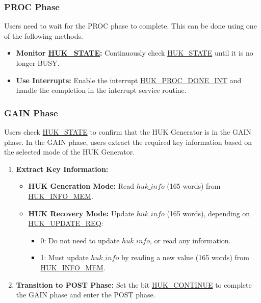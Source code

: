\documentclass[main\_\_EN.tex]{subfiles}
\begin{document}
\subsubsection{PROC Phase}

Users need to wait for the PROC phase to complete. This can be done using one of the following methods.
\begin{itemize}
    \item \textbf{Monitor \hyperref[fielddesc:HUKSTATE]{HUK\_STATE}:} Continuously check \hyperref[fielddesc:HUKSTATE]{HUK\_STATE} until it is no longer BUSY.
    \item \textbf{Use Interrupts:} Enable the interrupt \hyperref[int:HUKPROCDONEINT]{HUK\_PROC\_DONE\_INT} and handle the completion in the interrupt service routine.
\end{itemize}


\subsubsection{GAIN Phase}

Users check \hyperref[fielddesc:HUKSTATE]{HUK\_STATE} to confirm that the HUK Generator is in the GAIN phase. In the GAIN phase, users extract the required key information based on the selected mode of the HUK Generator.
\begin{enumerate}
    \item \textbf{Extract Key Information:}
    \begin{itemize}
        \item \textbf{HUK Generation Mode:} Read \hyperref[para:hukinfo]{\begin{math}huk\_info\end{math}} (165 words) from \hyperref[mem:huk-info]{HUK\_INFO\_MEM}.
        \item \textbf{HUK Recovery Mode:} Update \hyperref[para:hukinfo]{\begin{math}huk\_info\end{math}} (165 words), depending on \hyperref[fielddesc:HUKUPDATEREQ]{HUK\_UPDATE\_REQ}:
        \begin{itemize}
            \item 0: Do not need to update \hyperref[para:hukinfo]{\begin{math}huk\_info\end{math}}, or read any information.
            \item 1: Must update \hyperref[para:hukinfo]{\begin{math}huk\_info\end{math}} by reading a new value (165 words) from \hyperref[mem:huk-info]{HUK\_INFO\_MEM}. 
        \end{itemize}
    \end{itemize}
    \item \textbf{Transition to POST Phase:} Set the bit \hyperref[fielddesc:HUKCONTINUE]{HUK\_CONTINUE} to complete the GAIN phase and enter the POST phase.
\end{enumerate}
\end{document}
